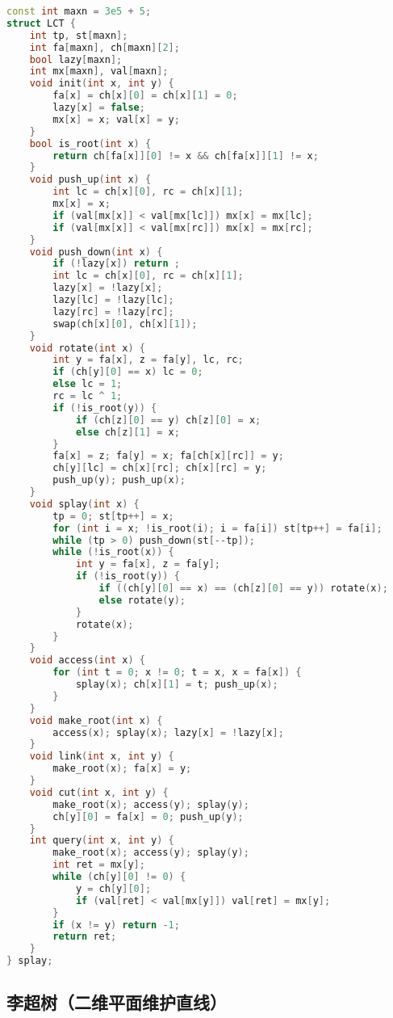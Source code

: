 \begin{lstlisting}[language=C++]
const int maxn = 3e5 + 5;
struct LCT {
    int tp, st[maxn];
    int fa[maxn], ch[maxn][2];
    bool lazy[maxn];
    int mx[maxn], val[maxn];
    void init(int x, int y) {
        fa[x] = ch[x][0] = ch[x][1] = 0;
        lazy[x] = false;
        mx[x] = x; val[x] = y;
    }
    bool is_root(int x) {
        return ch[fa[x]][0] != x && ch[fa[x]][1] != x;
    }
    void push_up(int x) {
        int lc = ch[x][0], rc = ch[x][1];
        mx[x] = x;
        if (val[mx[x]] < val[mx[lc]]) mx[x] = mx[lc];
        if (val[mx[x]] < val[mx[rc]]) mx[x] = mx[rc];
    }
    void push_down(int x) {
        if (!lazy[x]) return ;
        int lc = ch[x][0], rc = ch[x][1];
        lazy[x] = !lazy[x];
        lazy[lc] = !lazy[lc];
        lazy[rc] = !lazy[rc];
        swap(ch[x][0], ch[x][1]);
    }
    void rotate(int x) {
        int y = fa[x], z = fa[y], lc, rc;
        if (ch[y][0] == x) lc = 0;
        else lc = 1;
        rc = lc ^ 1;
        if (!is_root(y)) {
            if (ch[z][0] == y) ch[z][0] = x;
            else ch[z][1] = x;
        }
        fa[x] = z; fa[y] = x; fa[ch[x][rc]] = y;
        ch[y][lc] = ch[x][rc]; ch[x][rc] = y;
        push_up(y); push_up(x);
    }
    void splay(int x) {
        tp = 0; st[tp++] = x;
        for (int i = x; !is_root(i); i = fa[i]) st[tp++] = fa[i];
        while (tp > 0) push_down(st[--tp]);
        while (!is_root(x)) {
            int y = fa[x], z = fa[y];
            if (!is_root(y)) {
                if ((ch[y][0] == x) == (ch[z][0] == y)) rotate(x);
                else rotate(y);
            }
            rotate(x);
        }
    }
    void access(int x) {
        for (int t = 0; x != 0; t = x, x = fa[x]) {
            splay(x); ch[x][1] = t; push_up(x);
        }
    }
    void make_root(int x) {
        access(x); splay(x); lazy[x] = !lazy[x];
    }
    void link(int x, int y) {
        make_root(x); fa[x] = y;
    }
    void cut(int x, int y) {
        make_root(x); access(y); splay(y);
        ch[y][0] = fa[x] = 0; push_up(y);
    }
    int query(int x, int y) {
        make_root(x); access(y); splay(y);
        int ret = mx[y];
        while (ch[y][0] != 0) {
            y = ch[y][0];
            if (val[ret] < val[mx[y]]) val[ret] = mx[y];
        }
        if (x != y) return -1;
        return ret;
    }
} splay;
\end{lstlisting}

\subsection{李超树（二维平面维护直线）}

